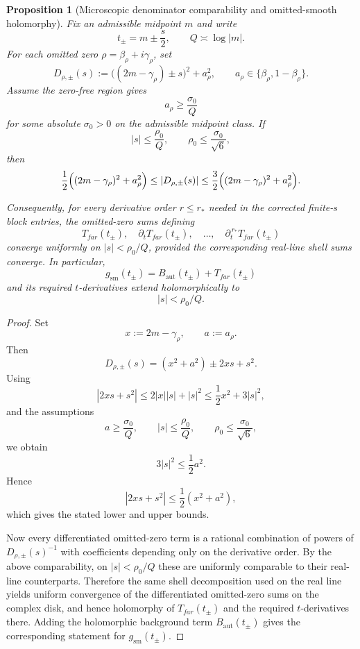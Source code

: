 \documentclass[11pt,a4paper]{amsart}
\def\far{far}%
\theoremstyle{plain}
\newtheorem{proposition}[theorem]{Proposition}
\theoremstyle{definition}
\newcommand{\Aut}{\mathrm{aut}}
\newcommand{\sm}{\mathrm{sm}}
\newcommand{\far}{\mathrm{far}}
\begin{document}
\begin{proposition}[Microscopic denominator comparability and omitted-smooth holomorphy]
\label{prop:denominator-comparability}
Fix an admissible midpoint $m$ and write
\[
t_\pm=m\pm \frac{s}{2},
\qquad
Q\asymp \log |m|.
\]
For each omitted zero $\rho=\beta_\rho+i\gamma_\rho$, set
\[
D_{\rho,\pm}(s):=\bigl((2m-\gamma_\rho)\pm s\bigr)^2+a_\rho^2,
\qquad
a_\rho\in\{\beta_\rho,1-\beta_\rho\}.
\]
Assume the zero-free region gives
\[
a_\rho\ge \frac{\sigma_0}{Q}
\]
for some absolute $\sigma_0>0$ on the admissible midpoint class. If
\[
|s|\le \frac{\rho_0}{Q},
\qquad
\rho_0\le \frac{\sigma_0}{\sqrt 6},
\]
then
\[
\frac12\Bigl((2m-\gamma_\rho)^2+a_\rho^2\Bigr)
\le
|D_{\rho,\pm}(s)|
\le
\frac32\Bigl((2m-\gamma_\rho)^2+a_\rho^2\Bigr).
\]

Consequently, for every derivative order $r\le r_*$ needed in the corrected
finite-$s$ block entries, the omitted-zero sums defining
\[
T_{\far}(t_\pm),\quad \partial_t T_{\far}(t_\pm),\quad \dots,\quad \partial_t^{\,r_*}T_{\far}(t_\pm)
\]
converge uniformly on $|s|<\rho_0/Q$, provided the corresponding real-line shell
sums converge. In particular,
\[
g_{\sm}(t_\pm)=B_{\Aut}(t_\pm)+T_{\far}(t_\pm)
\]
and its required $t$-derivatives extend holomorphically to
\[
|s|<\rho_0/Q.
\]
\end{proposition}

\begin{proof}
Set
\[
x:=2m-\gamma_\rho,\qquad a:=a_\rho.
\]
Then
\[
D_{\rho,\pm}(s)=(x^2+a^2)\pm 2xs+s^2.
\]
Using
\[
|2xs+s^2|\le 2|x||s|+|s|^2\le \frac12 x^2+3|s|^2,
\]
and the assumptions
\[
a\ge \frac{\sigma_0}{Q},
\qquad
|s|\le \frac{\rho_0}{Q},
\qquad
\rho_0\le \frac{\sigma_0}{\sqrt 6},
\]
we obtain
\[
3|s|^2\le \frac12 a^2.
\]
Hence
\[
|2xs+s^2|
\le
\frac12(x^2+a^2),
\]
which gives the stated lower and upper bounds.

Now every differentiated omitted-zero term is a rational combination of powers of
$D_{\rho,\pm}(s)^{-1}$ with coefficients depending only on the derivative order.
By the above comparability, on $|s|<\rho_0/Q$ these are uniformly comparable to
their real-line counterparts. Therefore the same shell decomposition used on the
real line yields uniform convergence of the differentiated omitted-zero sums on
the complex disk, and hence holomorphy of $T_{\far}(t_\pm)$ and the required
$t$-derivatives there. Adding the holomorphic background term $B_{\Aut}(t_\pm)$
gives the corresponding statement for $g_{\sm}(t_\pm)$.
\end{proof}
\end{document}
